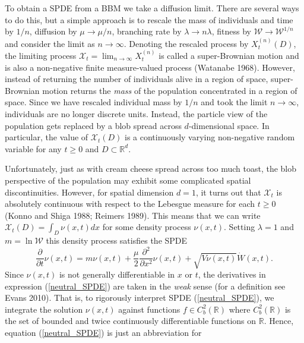 \documentclass[]{article}
\begin{document}
To obtain a SPDE from a BBM we take a diffusion limit. There are several
ways to do this, but a simple approach is to rescale the mass of
individuals and time by \(1/n\), diffusion by \(\mu\to\mu/n\), branching
rate by \(\lambda\to n\lambda\), fitness by
\(\mathscr{W}\to\mathscr{W}^{1/n}\) and consider the limit as
\(n\to\infty\). Denoting the rescaled process by \(X_t^{(n)}(D)\), the
limiting process \(\mathscr{X}_t=\lim_{n\to\infty}X_t^{(n)}\) is called
a super-Brownian motion and is also a non-negative finite measure-valued
process (Watanabe 1968). However, instead of returning the number of
individuals alive in a region of space, super-Brownian motion returns
the \emph{mass} of the population concentrated in a region of space.
Since we have rescaled individual mass by \(1/n\) and took the limit
\(n\to\infty\), individuals are no longer discrete units. Instead, the
particle view of the population gets replaced by a blob spread across
\(d\)-dimensional space. In particular, the value of
\(\mathscr{X}_t(D)\) is a continuously varying non-negative random
variable for any \(t\geq0\) and \(D\subset\mathbb{R}^d\).

Unfortunately, just as with cream cheese spread across too much toast,
the blob perspective of the population may exhibit some complicated
spatial discontinuities. However, for spatial dimension \(d=1\), it
turns out that \(\mathscr{X}_t\) is absolutely continuous with respect
to the Lebesgue measure for each \(t\geq0\) (Konno and Shiga 1988;
Reimers 1989). This means that we can write
\(\mathscr{X}_t(D)=\int_D \nu(x,t)dx\) for some density process
\(\nu(x,t)\). Setting \(\lambda=1\) and \(m=\ln\mathscr{W}\) this
density process satisfies the SPDE \begin{equation}\label{neutral_SPDE}
\frac{\partial}{\partial t}\nu(x,t)=m\nu(x,t)+\frac{\mu}{2}\frac{\partial^2}{\partial x^2}\nu(x,t)+\sqrt{V\nu(x,t)}\dot W(x,t).
\end{equation} Since \(\nu(x,t)\) is not generally differentiable in
\(x\) or \(t\), the derivatives in expression (\ref{neutral_SPDE}) are
taken in the \emph{weak} sense (for a definition see Evans 2010). That
is, to rigorously interpret SPDE (\ref{neutral_SPDE}), we integrate the
solution \(\nu(x,t)\) against functions \(f\in C_b^2(\mathbb{R})\) where
\(C_b^2(\mathbb{R})\) is the set of bounded and twice continuously
differentiable functions on \(\mathbb{R}\). Hence, equation
(\ref{neutral_SPDE}) is just an abbreviation for
\end{document}

